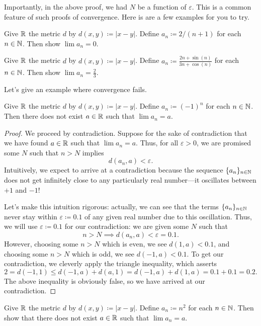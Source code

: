 \documentclass[../main.tex]{subfiles}
\begin{document}
Importantly, in the above proof, we had $N$ be a function of $\varepsilon$. This is a common feature of such proofs of convergence. Here is are a few examples for you to try.
\begin{exe}
    Give $\mathbb R$ the metric $d$ by $d(x,y)\coloneqq|x-y|$. Define $a_n\coloneqq2/(n+1)$ for each $n\in\mathbb N$. Then show $\lim a_n=0$.
\end{exe}
\begin{exe}
    Give $\mathbb R$ the metric $d$ by $d(x,y)\coloneqq|x-y|$. Define $a_n\coloneqq\frac{2n+\sin(n)}{3n+\cos(n)}$ for each $n\in\mathbb N$. Then show $\lim a_n=\frac23$.
\end{exe}
Let's give an example where convergence fails.
\begin{example}
    Give $\mathbb R$ the metric $d$ by $d(x,y)\coloneqq|x-y|$. Define $a_n\coloneqq(-1)^n$ for each $n\in\mathbb N$. Then there does not exist $a\in\mathbb R$ such that $\lim a_n=a$.
\end{example}
\begin{proof}
    We proceed by contradiction. Suppose for the sake of contradiction that we have found $a\in\mathbb R$ such that $\lim a_n=a$. Thus, for all $\varepsilon>0$, we are promised some $N$ such that $n>N$ implies
    \[d(a_n,a)<\varepsilon.\]
    Intuitively, we expect to arrive at a contradiction because the sequence $\{a_n\}_{n\in\mathbb N}$ does not get infinitely close to any particularly real number---it oscillates between $+1$ and $-1$!
    
    Let's make this intuition rigorous: actually, we can see that the terms $\{a_n\}_{n\in\mathbb N}$ never stay within $\varepsilon\coloneqq0.1$ of any given real number due to this oscillation. Thus, we will use $\varepsilon\coloneqq0.1$ for our contradiction: we are given some $N$ such that
    \[n>N\implies d(a_n,a)<\varepsilon=0.1.\]
    However, choosing some $n>N$ which is even, we see $d(1,a)<0.1$, and choosing some $n>N$ which is odd, we see $d(-1,a)<0.1$. To get our contradiction, we cleverly apply the triangle inequality, which asserts
    \[2=d(-1,1)\le d(-1,a)+d(a,1)=d(-1,a)+d(1,a)=0.1+0.1=0.2.\]
    The above inequality is obviously false, so we have arrived at our contradiction.
\end{proof}
\begin{exe}
    Give $\mathbb R$ the metric $d$ by $d(x,y)\coloneqq|x-y|$. Define $a_n\coloneqq n^2$ for each $n\in\mathbb N$. Then show that there does not exist $a\in\mathbb R$ such that $\lim a_n=a$.
\end{exe}
\end{document}
